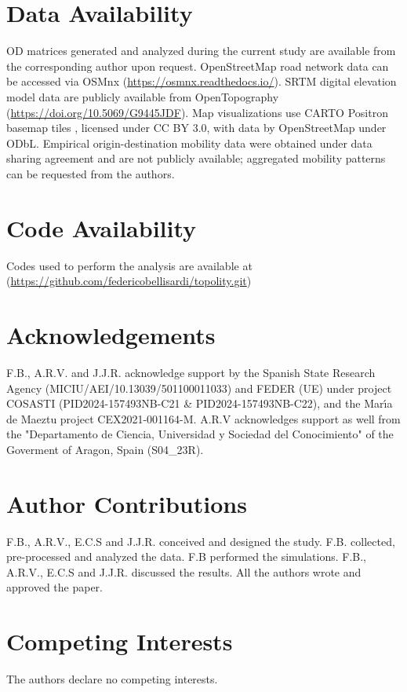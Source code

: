\documentclass[twocolumn,amsmath,amssymb,floatfix,nature,shownopacs,footinbib,superscriptaddress]{revtex4-2}
\begin{document}
\section*{Data Availability}

OD matrices generated and analyzed during the current study are available from the corresponding author upon  request. OpenStreetMap road network data can be accessed via OSMnx (\url{https://osmnx.readthedocs.io/}). SRTM digital elevation model data are publicly available from OpenTopography (\url{https://doi.org/10.5069/G9445JDF}). Map visualizations use CARTO Positron basemap tiles \cite{carto_positron}, licensed under CC BY 3.0, with data by OpenStreetMap under ODbL. Empirical origin-destination mobility data were obtained under data sharing agreement and are not publicly available; aggregated mobility patterns can be requested from the authors.

\section*{Code Availability}

Codes used to perform the analysis are available at 
(\url{https://github.com/federicobellisardi/topolity.git})

\section*{Acknowledgements}

F.B., A.R.V. and J.J.R. acknowledge support by the Spanish State Research Agency
(MICIU/AEI/10.13039/501100011033) and FEDER (UE) under project COSASTI (PID2024-157493NB-C21 \& PID2024-157493NB-C22), and the Mar{\'\i}a de Maeztu project CEX2021-001164-M. A.R.V acknowledges support as well from the "Departamento de Ciencia, Universidad y Sociedad del Conocimiento" of the Goverment of Aragon, Spain (S04\_23R). 

\section*{Author Contributions}
F.B., A.R.V., E.C.S and J.J.R. conceived and designed the study. F.B. collected, pre-processed and analyzed the data. F.B performed the simulations. F.B., A.R.V., E.C.S and J.J.R. discussed the results. All the authors wrote and approved the paper.

\section*{Competing Interests}
The authors declare no competing interests.



\end{document}
